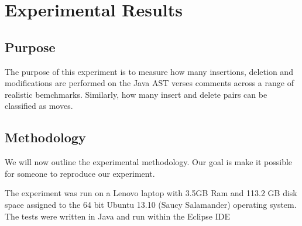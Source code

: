 
\chapter{Experimental Results}

\section{Purpose}
The purpose of this experiment is to measure how many insertions, deletion and modifications are performed on the Java AST verses comments across a range of realistic bemchmarks. Similarly, how many insert and delete pairs can be classified as moves. 


\section{Methodology}
We will now outline the experimental methodology. Our goal is make it possible for someone to reproduce our experiment.

The experiment was run on a Lenovo laptop with 3.5GB Ram and 113.2 GB disk space assigned to the 64 bit Ubuntu 13.10 (Saucy Salamander) operating system. The tests were written in Java and run within the Eclipse IDE



 
 
